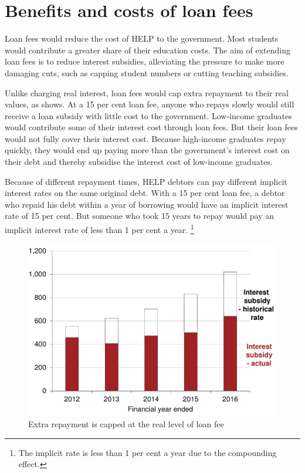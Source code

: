\documentclass[embargoed]{grattan}
\begin{document}
\section{Benefits and costs of loan fees}\label{sec:benefits-and-costs-of-loan-fees}

Loan fees would reduce the cost of \gls{HELP} to the government.
Most students would contribute a greater share of their education costs.
The aim of extending loan fees is to reduce interest subsidies, alleviating the pressure to make more damaging cuts, such as capping student numbers or cutting teaching subsidies.

Unlike charging real interest, loan fees would cap extra repayment to their real values, as  shows.
At a 15 per cent loan fee, anyone who repays slowly would still receive a loan subsidy with little cost to the government.
Low-income graduates would contribute some of their interest cost through loan fees.
But their loan fees would not fully cover their interest cost.
Because high-income graduates repay quickly, they would end up paying more than the government's interest cost on their debt and thereby subsidise the interest cost of low-income graduates.

Because of different repayment times, \gls{HELP} debtors can pay different implicit interest rates on the same original debt.
With a 15 per cent loan fee, a debtor who repaid his debt within a year of borrowing would have an implicit interest rate of 15 per cent.
But someone who took 15 years to repay would pay an implicit interest rate of less than 1 per cent a year.%
\footnote{The implicit rate is less than 1 per cent a year due to the compounding effect.}

\begin{figure}
\caption{Extra repayment is capped at the real level of loan fee}\label{fig:fig22-extra-repayment-capped-at-real-level-of-loan-fee}

\includegraphics[page=22]{atlas/Chartpack.pdf}

\end{figure}
\end{document}
